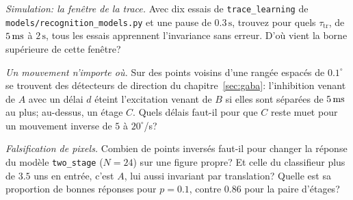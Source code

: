 \begin{exercise}[\lvlB]
\label{ex:12:6}
\emph{Simulation: la fenêtre de la trace.} Avec dix essais de \texttt{trace\_learning} de \texttt{models/\allowbreak recognition\_models.py} et une pause de $0.3\,\text{s}$, trouvez pour quels $\tau_{\text{tr}}$, de $5\,\text{ms}$ à $2\,\text{s}$, tous les essais apprennent l'invariance sans erreur. D'où vient la borne supérieure de cette fenêtre?
\end{exercise}

\begin{exercise}[\lvlB]
\label{ex:12:7}
\emph{Un mouvement n'importe où.} Sur des points voisins d'une rangée espacés de $0.1^\circ$ se trouvent des détecteurs de direction du chapitre~\ref{sec:gaba}: l'inhibition venant de $A$ avec un délai $d$ éteint l'excitation venant de $B$ si elles sont séparées de $5\,\text{ms}$ au plus; au-dessus, un étage $C$. Quels délais faut-il pour que $C$ reste muet pour un mouvement inverse de $5$ à $20^\circ$/s?
\end{exercise}

\begin{exercise}[\lvlC]
\label{ex:12:8}
\emph{Falsification de pixels.} Combien de points inversés faut-il pour changer la réponse du modèle \texttt{two\_stage} ($N=24$) sur une figure propre? Et celle du classifieur \og plus de $3.5$ uns en entrée, c'est $A$\fg{}, lui aussi invariant par translation? Quelle est sa proportion de bonnes réponses pour $p=0.1$, contre $0.86$ pour la paire d'étages?
\end{exercise}
